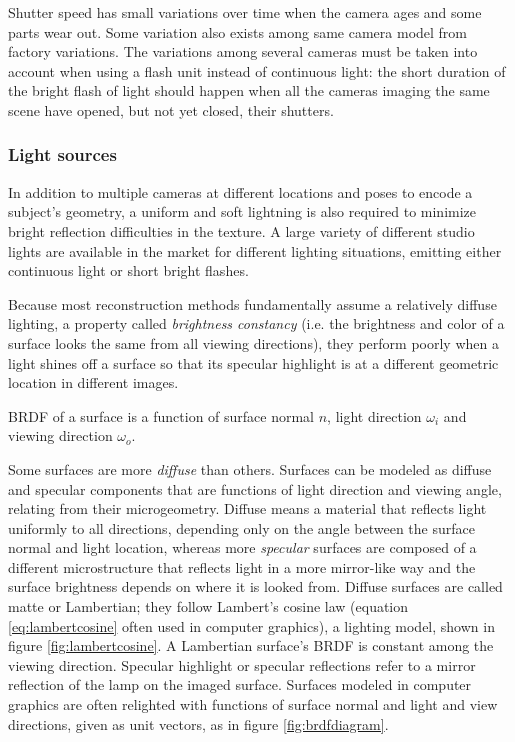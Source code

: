 Shutter speed has small variations over time when the camera ages and some parts wear out.
Some variation also exists among same camera model from factory variations.
The variations among several cameras must be taken into account when using a flash unit instead of continuous light: the short duration of the bright flash of light should happen when all the cameras imaging the same scene have opened, but not yet closed, their shutters.



\subsubsection{Light sources} %

In addition to multiple cameras at different locations and poses to encode a subject's geometry, a uniform and soft lightning is also required to minimize bright reflection difficulties in the texture.
A large variety of different studio lights are available in the market for different lighting situations, emitting either continuous light or short bright flashes.

Because most reconstruction methods fundamentally assume a relatively diffuse lighting, a property called \emph{brightness constancy} (i.e. the brightness and color of a surface looks the same from all viewing directions), they perform poorly when a light shines off a surface so that its specular highlight is at a different geometric location in different images.

{BRDF of a surface is a function of surface normal $n$, light direction $\omega_i$ and viewing direction $\omega_o$.}

Some surfaces are more \emph{diffuse} than others.
Surfaces can be modeled as diffuse and specular components that are functions of light direction and viewing angle, relating from their microgeometry. \cite{nayar1991surface} %
Diffuse means a material that reflects light uniformly to all directions, depending only on the angle between the surface normal and light location, whereas more \emph{specular} surfaces are composed of a different microstructure that reflects light in a more mirror-like way and the surface brightness depends on where it is looked from.
Diffuse surfaces are called matte or Lambertian; they follow Lambert's cosine law (equation \ref{eq:lambertcosine} often used in computer graphics), a lighting model, shown in figure \ref{fig:lambertcosine}. \cite{lamberttodo}
A Lambertian surface's BRDF is constant among the viewing direction.
Specular highlight or specular reflections refer to a mirror reflection of the lamp on the imaged surface.
Surfaces modeled in computer graphics are often relighted with functions of surface normal and light and view directions, given as unit vectors, as in figure \ref{fig:brdfdiagram}.


